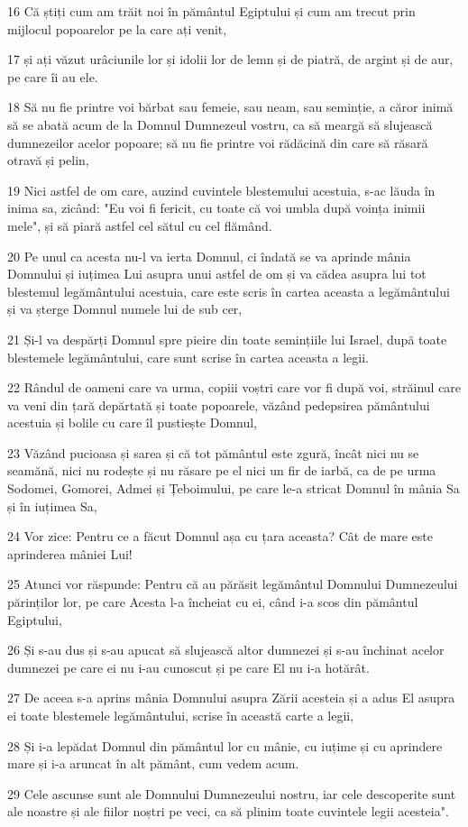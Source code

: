 \par 16 Că știți cum am trăit noi în pământul Egiptului și cum am trecut prin mijlocul popoarelor pe la care ați venit,
\par 17 și ați văzut urâciunile lor și idolii lor de lemn și de piatră, de argint și de aur, pe care îi au ele.
\par 18 Să nu fie printre voi bărbat sau femeie, sau neam, sau seminție, a căror inimă să se abată acum de la Domnul Dumnezeul vostru, ca să meargă să slujească dumnezeilor acelor popoare; să nu fie printre voi rădăcină din care să răsară otravă și pelin,
\par 19 Nici astfel de om care, auzind cuvintele blestemului acestuia, s-ac lăuda în inima sa, zicând: "Eu voi fi fericit, cu toate că voi umbla după voința inimii mele", și să piară astfel cel sătul cu cel flămând.
\par 20 Pe unul ca acesta nu-l va ierta Domnul, ci îndată se va aprinde mânia Domnului și iuțimea Lui asupra unui astfel de om și va cădea asupra lui tot blestemul legământului acestuia, care este scris în cartea aceasta a legământului și va șterge Domnul numele lui de sub cer,
\par 21 Și-l va despărți Domnul spre pieire din toate semințiile lui Israel, după toate blestemele legământului, care sunt scrise în cartea aceasta a legii.
\par 22 Rândul de oameni care va urma, copiii voștri care vor fi după voi, străinul care va veni din țară depărtată și toate popoarele, văzând pedepsirea pământului acestuia și bolile cu care îl pustiește Domnul,
\par 23 Văzând pucioasa și sarea și că tot pământul este zgură, încât nici nu se seamănă, nici nu rodește și nu răsare pe el nici un fir de iarbă, ca de pe urma Sodomei, Gomorei, Admei și Țeboimului, pe care le-a stricat Domnul în mânia Sa și în iuțimea Sa,
\par 24 Vor zice: Pentru ce a făcut Domnul așa cu țara aceasta? Cât de mare este aprinderea mâniei Lui!
\par 25 Atunci vor răspunde: Pentru că au părăsit legământul Domnului Dumnezeului părinților lor, pe care Acesta l-a încheiat cu ei, când i-a scos din pământul Egiptului,
\par 26 Și s-au dus și s-au apucat să slujească altor dumnezei și s-au închinat acelor dumnezei pe care ei nu i-au cunoscut și pe care El nu i-a hotărât.
\par 27 De aceea s-a aprins mânia Domnului asupra Zării acesteia și a adus El asupra ei toate blestemele legământului, scrise în această carte a legii,
\par 28 Și i-a lepădat Domnul din pământul lor cu mânie, cu iuțime și cu aprindere mare și i-a aruncat în alt pământ, cum vedem acum.
\par 29 Cele ascunse sunt ale Domnului Dumnezeului nostru, iar cele descoperite sunt ale noastre și ale fiilor noștri pe veci, ca să plinim toate cuvintele legii acesteia".

